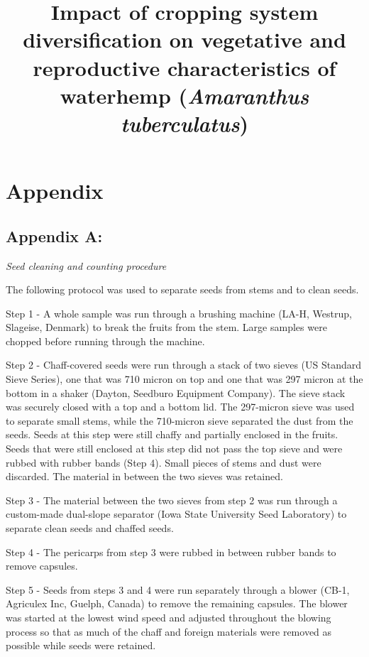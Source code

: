 \documentclass[
]{article}
\title{Impact of cropping system diversification on vegetative and reproductive characteristics of waterhemp (\emph{Amaranthus tuberculatus})}
\author{}
\date{\vspace{-2.5em}}
\begin{document}
\maketitle

\hypertarget{appendix}{%
\section*{Appendix}\label{appendix}}

\hypertarget{appendix-a}{%
\subsection{Appendix A:}\label{appendix-a}}

\emph{Seed cleaning and counting procedure}

The following protocol was used to separate seeds from stems and to clean seeds.

Step 1 - A whole sample was run through a brushing machine (LA-H, Westrup, Slageise, Denmark) to break the fruits from the stem. Large samples were chopped before running through the machine.

Step 2 - Chaff-covered seeds were run through a stack of two sieves (US Standard Sieve Series), one that was 710 micron on top and one that was 297 micron at the bottom in a shaker (Dayton, Seedburo Equipment Company). The sieve stack was securely closed with a top and a bottom lid. The 297-micron sieve was used to separate small stems, while the 710-micron sieve separated the dust from the seeds. Seeds at this step were still chaffy and partially enclosed in the fruits. Seeds that were still enclosed at this step did not pass the top sieve and were rubbed with rubber bands (Step 4). Small pieces of stems and dust were discarded. The material in between the two sieves was retained.

Step 3 - The material between the two sieves from step 2 was run through a custom-made dual-slope separator (Iowa State University Seed Laboratory) to separate clean seeds and chaffed seeds.

Step 4 - The pericarps from step 3 were rubbed in between rubber bands to remove capsules.

Step 5 - Seeds from steps 3 and 4 were run separately through a blower (CB-1, Agriculex Inc, Guelph, Canada) to remove the remaining capsules. The blower was started at the lowest wind speed and adjusted throughout the blowing process so that as much of the chaff and foreign materials were removed as possible while seeds were retained.
\end{document}
